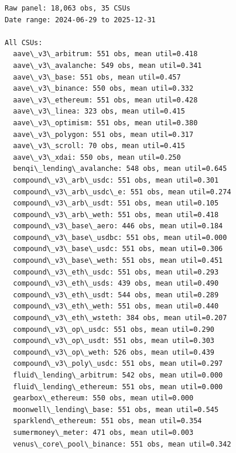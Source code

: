 \documentclass[11pt]{article}
\begin{document}
    \begin{Verbatim}[commandchars=\\\{\}]
Raw panel: 18,063 obs, 35 CSUs
Date range: 2024-06-29 to 2025-12-31

All CSUs:
  aave\_v3\_arbitrum: 551 obs, mean util=0.418
  aave\_v3\_avalanche: 549 obs, mean util=0.341
  aave\_v3\_base: 551 obs, mean util=0.457
  aave\_v3\_binance: 550 obs, mean util=0.332
  aave\_v3\_ethereum: 551 obs, mean util=0.428
  aave\_v3\_linea: 323 obs, mean util=0.415
  aave\_v3\_optimism: 551 obs, mean util=0.380
  aave\_v3\_polygon: 551 obs, mean util=0.317
  aave\_v3\_scroll: 70 obs, mean util=0.415
  aave\_v3\_xdai: 550 obs, mean util=0.250
  benqi\_lending\_avalanche: 548 obs, mean util=0.645
  compound\_v3\_arb\_usdc: 551 obs, mean util=0.301
  compound\_v3\_arb\_usdc\_e: 551 obs, mean util=0.274
  compound\_v3\_arb\_usdt: 551 obs, mean util=0.105
  compound\_v3\_arb\_weth: 551 obs, mean util=0.418
  compound\_v3\_base\_aero: 446 obs, mean util=0.184
  compound\_v3\_base\_usdbc: 551 obs, mean util=0.000
  compound\_v3\_base\_usdc: 551 obs, mean util=0.306
  compound\_v3\_base\_weth: 551 obs, mean util=0.451
  compound\_v3\_eth\_usdc: 551 obs, mean util=0.293
  compound\_v3\_eth\_usds: 439 obs, mean util=0.490
  compound\_v3\_eth\_usdt: 544 obs, mean util=0.289
  compound\_v3\_eth\_weth: 551 obs, mean util=0.440
  compound\_v3\_eth\_wsteth: 384 obs, mean util=0.207
  compound\_v3\_op\_usdc: 551 obs, mean util=0.290
  compound\_v3\_op\_usdt: 551 obs, mean util=0.303
  compound\_v3\_op\_weth: 526 obs, mean util=0.439
  compound\_v3\_poly\_usdc: 551 obs, mean util=0.297
  fluid\_lending\_arbitrum: 542 obs, mean util=0.000
  fluid\_lending\_ethereum: 551 obs, mean util=0.000
  gearbox\_ethereum: 550 obs, mean util=0.000
  moonwell\_lending\_base: 551 obs, mean util=0.545
  sparklend\_ethereum: 551 obs, mean util=0.354
  sumermoney\_meter: 471 obs, mean util=0.003
  venus\_core\_pool\_binance: 551 obs, mean util=0.342
    \end{Verbatim}
\end{document}
